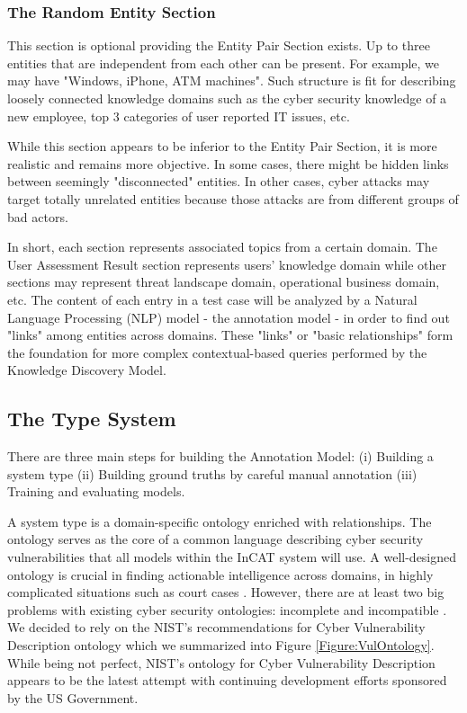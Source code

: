 \documentclass[conference]{IEEEtran}
\begin{document}
\subsubsection{The Random Entity Section}
This section is optional providing the Entity Pair Section exists. Up to three entities that are independent from each other can be present. For example, we may have "Windows, iPhone, ATM machines". Such structure is fit for describing loosely connected knowledge domains such as the cyber security knowledge of a new employee, top 3 categories of user reported IT issues, etc.

While this section appears to be inferior to the Entity Pair Section, it is more realistic and remains more objective. In some cases, there might be hidden links between seemingly "disconnected" entities. In other cases, cyber attacks may target totally unrelated entities because those attacks are from different groups of bad actors.

In short, each section represents associated topics from a certain domain. The User Assessment Result section represents users' knowledge domain while other sections may represent threat landscape domain, operational business domain, etc. The content of each entry in a test case will be analyzed by a Natural Language Processing (NLP) model - the annotation model - in order to find out "links" among entities across domains. These "links" or "basic relationships" form the foundation for more complex contextual-based queries performed by the Knowledge Discovery Model.


\subsection{The Type System}
There are three main steps for building the Annotation Model: (i) Building a system type (ii) Building ground truths by careful manual annotation (iii) Training and evaluating models.

A system type is a domain-specific ontology enriched with relationships. The ontology serves as the core of a common language describing cyber security vulnerabilities that all models within the InCAT system will use. A well-designed ontology is crucial in finding actionable intelligence across domains, in highly complicated situations such as court cases \cite{Michel2018CyberCybercrime}. However, there are at least two big problems with existing cyber security ontologies: incomplete and incompatible \cite{Mavroeidis2017CyberIntelligence}. We decided to rely on the NIST's recommendations for Cyber Vulnerability Description ontology \cite{Booth2016DraftOntology} which we summarized into Figure \ref{Figure:VulOntology}. While being not perfect, NIST's ontology for Cyber Vulnerability Description appears to be the latest attempt with continuing development efforts sponsored by the US Government.
\end{document}

